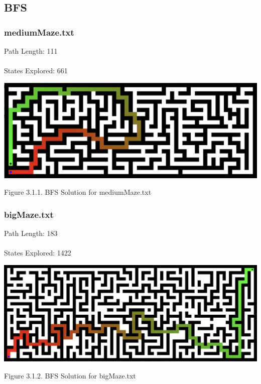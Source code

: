 \documentclass{mcmthesis}
\begin{document}
\subsection{BFS}

\subsubsection{mediumMaze.txt}
Path Length: 111 \\ \\
States Explored: 661
\begin{center}
\includegraphics[width=15cm]{bfs_mediummaze.png}
\end{center}
\begin{center}
\small{Figure 3.1.1. BFS Solution for mediumMaze.txt}
\end{center}

\subsubsection{bigMaze.txt}
Path Length: 183 \\ \\
States Explored: 1422
\begin{center}
\includegraphics[width=15cm]{bfs_bigmaze.png}
\end{center}
\begin{center}
\small{Figure 3.1.2. BFS Solution for bigMaze.txt}
\end{center}
\end{document}

